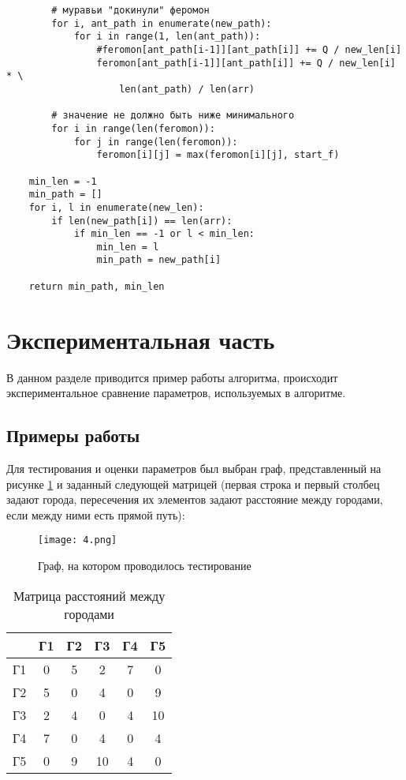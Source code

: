 \documentclass[12pt,a4paper]{scrartcl}
\begin{document}
\begin{verbatim}
        # муравьи "докинули" феромон
        for i, ant_path in enumerate(new_path):
            for i in range(1, len(ant_path)):
                #feromon[ant_path[i-1]][ant_path[i]] += Q / new_len[i]
                feromon[ant_path[i-1]][ant_path[i]] += Q / new_len[i] * \
                    len(ant_path) / len(arr)
                
        # значение не должно быть ниже минимального
        for i in range(len(feromon)):
            for j in range(len(feromon)):
                feromon[i][j] = max(feromon[i][j], start_f)

    min_len = -1
    min_path = []
    for i, l in enumerate(new_len):
        if len(new_path[i]) == len(arr):
            if min_len == -1 or l < min_len:
                min_len = l
                min_path = new_path[i]

    return min_path, min_len
\end{verbatim}


 \clearpage
\section{Экспериментальная часть}

В данном разделе приводится пример работы алгоритма, происходит экспериментальное сравнение параметров, используемых в алгоритме.

\subsection{Примеры работы}

Для тестирования и оценки параметров был выбран граф, представленный на рисунке \ref{graph2.6} и заданный следующей матрицей (первая строка и первый столбец задают города, пересечения их элементов задают расстояние между городами, если между ними есть прямой путь):

\begin{figure}[h!]
	\centering
	\texttt{[image: 4.png]}
	\caption{Граф, на котором проводилось тестирование}
	\label{graph2.6}
\end{figure}

\begin{table}[ht]
	\caption{Матрица расстояний между городами}
	\begin{tabular}{|l|c|c|c|c|c|}
		\hline
		 & Г1 & Г2 & Г3 & Г4 & Г5\\
		\hline
		\hline
		Г1 & 0 & 5 & 2  & 7 &  0\\
		\hline
		Г2 & 5 & 0 & 4 & 0 & 9\\
		\hline
		Г3 & 2 & 4 & 0 & 4 & 10\\
		\hline
		Г4 & 7 & 0 & 4 & 0 & 4\\
		\hline
		Г5 & 0 & 9 & 10 & 4 & 0\\
		\hline
	\end{tabular}
	\label{tab:tabular}
\end{table}
\end{document}
